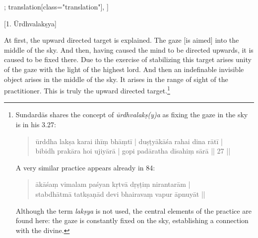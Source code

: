 \begin{alignment}[
  texts=edition[class="edition"];
  translation[class="translation"],
  ]
\begin{translation}
\begin{tlate}
 \end{tlate}
     \smallskip
    \centerline{\textrm{\small{[1. Ūrdhvalakṣya]}}}
    \bigskip    
  \begin{tlate}
    At first, the upward directed target is explained. The gaze [is aimed] into the middle of the sky. And then, having caused the mind to be directed upwards, it is caused to be fixed there. Due to the exercise of stabilizing this target arises unity of the gaze with the light of the highest lord. And then an indefinable invisible object arises in the middle of the sky. It arises in the range of sight of the practitioner. This is truly the upward directed target.\footnote{Sundardās shares the concept of \textit{ūrdhvalakṣ(y)a} as fixing the gaze in the sky is in his  3.27: 
\begin{quote}
ūrddha lakṣa karai ihīṃ bhāṃtī | duṣṭyākāśa rahai dina rātī |\\ 
bibidh prakāra hoi ujiyārā | gopi padāratha dīsahiṃ sārā || 27 ||
\end{quote}
A very similar practice appears already in  84:
      \begin{quote}
ākāśaṃ vimalam paśyan kṛtvā dṛṣṭiṃ nirantarām |  \\
stabdhātmā tatkṣaṇād devi bhairavaṃ vapur āpnuyāt ||
\end{quote}
Although the term \textit{lakṣya} is not used, the central elements of the practice are found here: the gaze is constantly fixed on the sky, establishing a connection with the divine.} \vspace*{\fill} 
  \end{tlate}
  \end{translation}
  \ekdpb*{}
\end{alignment}
